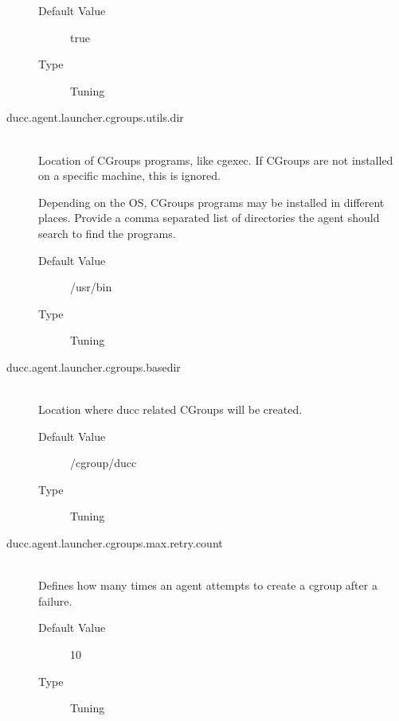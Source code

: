 \begin{description}
            \begin{description}
              \item[Default Value] true
              \item[Type] Tuning 
            \end{description}
            
          \item[ducc.agent.launcher.cgroups.utils.dir] \hfill \\
            \label{itm:ducc.agent.launcher.cgroups.utils.dir}
            Location of CGroups programs, like cgexec. If CGroups are not
            installed on a specific machine, this is ignored.

            Depending on the OS, CGroups programs may be installed in different places. 
            Provide a comma separated list of directories the agent should search to find the programs.  

            \begin{description}
              \item[Default Value] /usr/bin
              \item[Type] Tuning 
            \end{description}

          \item[ducc.agent.launcher.cgroups.basedir] \hfill \\
            \label{itm:ducc.agent.launcher.cgroups.basedir}
            Location where ducc related CGroups will be created.

            \begin{description}
              \item[Default Value] /cgroup/ducc
              \item[Type] Tuning 
            \end{description}

          \item[ducc.agent.launcher.cgroups.max.retry.count] \hfill \\
            \label{ducc.agent.launcher.cgroups.max.retry.count}
            Defines how many times an agent attempts to create a cgroup after
            a failure. 

            \begin{description}
              \item[Default Value] 10
              \item[Type] Tuning 
            \end{description}


\end{description}
